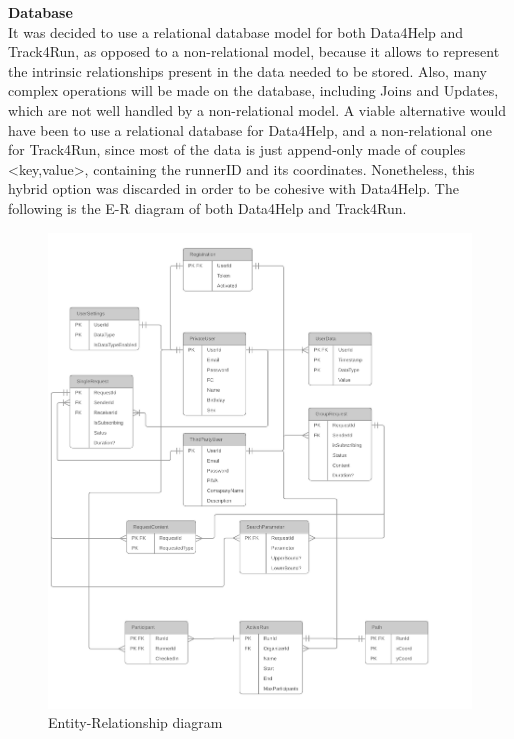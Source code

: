 \documentclass[titlepage]{article}
\begin{document}
{\bf Database}\\
It was decided to use a relational database model for both Data4Help and Track4Run, as opposed to a non-relational model, because it allows to represent the intrinsic relationships present in the data needed to be stored. Also, many complex operations will be made on the database, including Joins and Updates, which are not well handled by a non-relational model. 
A viable alternative would have been to use a relational database for Data4Help, and a non-relational one for Track4Run, since most of the data is just append-only made of couples <key,value>, containing the runnerID and its coordinates. Nonetheless, this hybrid option was discarded in order to be cohesive with Data4Help.
The following is the E-R diagram of both Data4Help and Track4Run.

\begin{figure}[H]
	\center
  	\includegraphics[width=15cm]{ER.png}
  	\caption{Entity-Relationship diagram}
 	\label{fig:ER}
\end{figure}

\pagebreak

\end{document}
